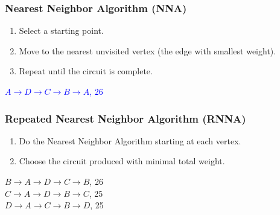 \documentclass{beamer}
\theoremstyle{definition}
\begin{document}
\begin{frame}
\frametitle{Nearest Neighbor Algorithm (NNA)}
\begin{enumerate}
\item	Select a starting point.
\item	Move to the nearest unvisited vertex (the edge with smallest weight).
\item	Repeat until the circuit is complete.
\end{enumerate}
\pause
\begin{center}


\textcolor{blue}{$A\rightarrow D \rightarrow C \rightarrow B \rightarrow A$, 26}
\end{center}
\end{frame}
%

\begin{frame}
\frametitle{Repeated Nearest Neighbor Algorithm (RNNA)}
\begin{enumerate}
\item	Do the Nearest Neighbor Algorithm starting at each vertex.
\item	Choose the circuit produced with minimal total weight.
\end{enumerate}
\pause
\begin{center}
$B\rightarrow A \rightarrow D \rightarrow C \rightarrow B$, 26\\
$C\rightarrow A \rightarrow D \rightarrow B \rightarrow C$, 25\\
$D\rightarrow A \rightarrow C \rightarrow B \rightarrow D$, 25
\end{center}
\end{frame}
\end{document}
